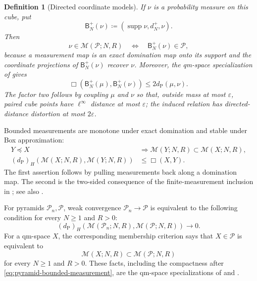 \documentclass[10pt,a4paper]{amsart}
\numberwithin{equation}{section}
\newtheorem*{definition*}{Definition}
\DeclareMathOperator{\supp}{supp}
\newcommand{\eps}{\varepsilon}
\begin{document}
\begin{definition*}[Directed coordinate models]
If $\nu$ is a probability measure on this cube, put
\[ \mathsf B_N^+(\nu)\coloneqq(\supp\nu,d_N^+,\nu). \]
Then
\begin{equation}\label{eq:coordinate-model-membership} \nu\in\mathcal M(\mathcal P;N,R)\quad\Longleftrightarrow\quad\mathsf B_N^+(\nu)\in\mathcal P, \end{equation}
because a measurement map is an exact domination map onto its support and the coordinate projections of $\mathsf B_N^+(\nu)$ recover $\nu$.  Moreover, the qm-space specialization of \cite[Lemma~B.1]{gds3-ja} gives
\begin{equation}\label{eq:coordinate-model-box} \Box(\mathsf B_N^+(\mu),\mathsf B_N^+(\nu))\le2d_{\mathrm P}(\mu,\nu). \end{equation}
The factor two follows by coupling $\mu$ and $\nu$ so that, outside mass at most $\eps$, paired cube points have $\ell^\infty$ distance at most $\eps$; the induced relation has directed-distance distortion at most $2\eps$.
\end{definition*}

Bounded measurements are monotone under exact domination and stable under Box approximation:
\begin{equation}\label{eq:measurement-box-stability}
\begin{aligned}
Y\preceq X&\Longrightarrow\mathcal M(Y;N,R)\subset\mathcal M(X;N,R),\\
(d_{\mathrm P})_H(\mathcal M(X;N,R),\mathcal M(Y;N,R))&\le\Box(X,Y).
\end{aligned}
\end{equation}
The first assertion follows by pulling measurements back along a domination map.  The second is the two-sided consequence of the finite-measurement inclusion in \cite[Proposition~3.9]{one-sided-pyramids}; see also \cite[Lemma~B.2]{gds3-ja}.

For pyramids $\mathcal P_n,\mathcal P$, weak convergence $\mathcal P_n\to\mathcal P$ is equivalent to the following condition for every $N\ge1$ and $R>0$:
\begin{equation}\label{eq:measurement-convergence-criterion} (d_{\mathrm P})_H(\mathcal M(\mathcal P_n;N,R),\mathcal M(\mathcal P;N,R))\longrightarrow0. \end{equation}
For a qm-space $X$, the corresponding membership criterion says that $X\in\mathcal P$ is equivalent to
\begin{equation}\label{eq:measurement-membership-criterion} \mathcal M(X;N,R)\subset\mathcal M(\mathcal P;N,R) \end{equation}
for every $N\ge1$ and $R>0$.
These facts, including the compactness after \eqref{eq:pyramid-bounded-measurement}, are the qm-space specializations of \cite[Theorem~4.4, Theorem~B.5, and Proposition~B.6]{gds3-ja} and \cite[Lemmas~3.12 and~3.14]{one-sided-pyramids}.
\end{document}
